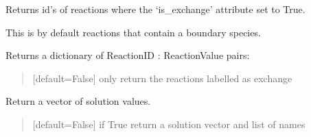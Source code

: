 \documentclass[letterpaper,12pt,english]{sphinxmanual}
\begin{document}
\begin{fulllineitems}
\begin{fulllineitems}
\label{\detokenize{api/core:cbmpy.CBModel.Model.getExchangeReactionIds}}
\pysigstartsignatures
\pysiglinewithargsret
{}
{}
{}
\pysigstopsignatures
\sphinxAtStartPar
Returns id’s of reactions where the ‘is\_exchange’ attribute set to True.

\sphinxAtStartPar
This is by default reactions that contain a boundary species.

\end{fulllineitems}


\begin{fulllineitems}
\label{\detokenize{api/core:cbmpy.CBModel.Model.getReactionValues}}
\pysigstartsignatures
\pysiglinewithargsret
{}
{}
{}
\pysigstopsignatures
\sphinxAtStartPar
Returns a dictionary of ReactionID : ReactionValue pairs:
\begin{quote}\begin{description}
\sphinxAtStartPar
{} \textendash{} {[}default=False{]} only return the reactions labelled as exchange

\end{description}\end{quote}

\end{fulllineitems}


\begin{fulllineitems}
\label{\detokenize{api/core:cbmpy.CBModel.Model.getSolutionVector}}
\pysigstartsignatures
\pysiglinewithargsret
{}
{}
{}
\pysigstopsignatures
\sphinxAtStartPar
Return a vector of solution values.
\begin{quote}\begin{description}
\sphinxAtStartPar
{} \textendash{} {[}default=False{]} if True return a solution vector and list of names


\end{description}
\end{quote}
\end{fulllineitems}
\end{fulllineitems}
\end{document}
